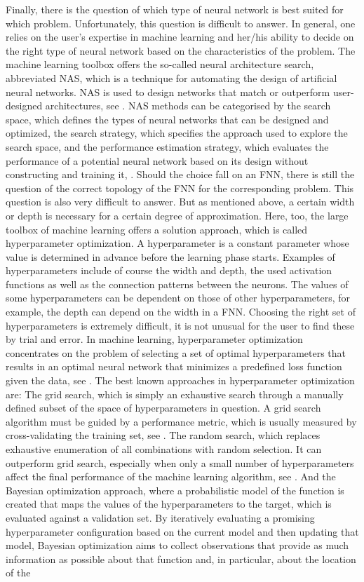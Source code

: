 Finally, there is the question of which type of neural network is best suited for which problem. Unfortunately, this question is difficult to answer. In general, one relies on the user's expertise in machine learning and her/his ability to decide on the right type of neural network based on the characteristics of the problem. The machine learning toolbox offers the so-called neural architecture search, abbreviated NAS, which is a technique for automating the design of artificial neural networks. NAS is used to design networks that match or outperform user-designed architectures, see \cite{ZophLe:2017}. NAS methods can be categorised by the search space, which defines the types of neural networks that can be designed and optimized, the search strategy, which specifies the approach used to explore the search space, and the performance estimation strategy, which evaluates the performance of a potential neural network based on its design without constructing and training it, \cite{ElskenMetzenHutter:2019}. Should the choice fall on an FNN, there is still the question of the correct topology of the FNN for the corresponding problem. This question is also very difficult to answer. But as mentioned above, a certain width or depth is necessary for a certain degree of approximation. Here, too, the large toolbox of machine learning offers a solution approach, which is called hyperparameter optimization. A hyperparameter is a constant parameter whose value is determined in advance before the learning phase starts. Examples of hyperparameters include of course the width and depth, the used activation functions as well as the connection patterns between the neurons. The values of some hyperparameters can be dependent on those of other hyperparameters, for example, the depth can depend on the width in a FNN. Choosing the right set of hyperparameters is extremely difficult, it is not unusual for the user to find these by trial and error. In machine learning, hyperparameter optimization concentrates on the problem of selecting a set of optimal hyperparameters that results in an optimal neural network that minimizes a predefined loss function given the data, see \cite{ClaesenDeMoor:2015}. The best known approaches in hyperparameter optimization are: The grid search, which is simply an exhaustive search through a manually defined subset of the space of hyperparameters in question. A grid search algorithm must be guided by a performance metric, which is usually measured by cross-validating the training set, see \cite{HsuChangLin:2003}. The random search, which replaces exhaustive enumeration of all combinations with random selection. It can outperform grid search, especially when only a small number of hyperparameters affect the final performance of the machine learning algorithm, see \cite{BergstraBengio:2012}. And the Bayesian optimization approach, where a probabilistic model of the function is created that maps the values of the hyperparameters to the target, which is evaluated against a validation set. By iteratively evaluating a promising hyperparameter configuration based on the current model and then updating that model, Bayesian optimization aims to collect observations that provide as much information as possible about that function and, in particular, about the location of the 